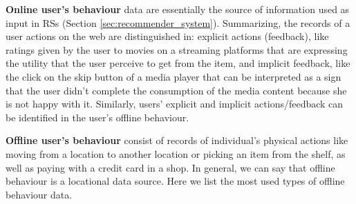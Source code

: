 \textbf{Online user's behaviour} data are essentially the source of information used as input in RSs (Section \ref{sec:recommender_system}). Summarizing, the records of a user actions on the web are distinguished in: explicit actions (feedback), like ratings given by the user to movies on a streaming platforms that are expressing the utility that the user perceive to get from the item, and implicit feedback, like the click on the skip button of a media player that can be interpreted as a sign that the user didn't complete the consumption of the media content because she is not happy with it. Similarly, users' explicit and implicit actions/feedback can be identified in the user's offline behaviour. 

\textbf{Offline user's behaviour} consist of records of individual's physical actions like moving from a location to another location or picking an item from the shelf, as well as paying with a credit card in a shop. In general, we can say that offline behaviour is a locational data source. 
Here we list the most used types of offline behaviour data.


